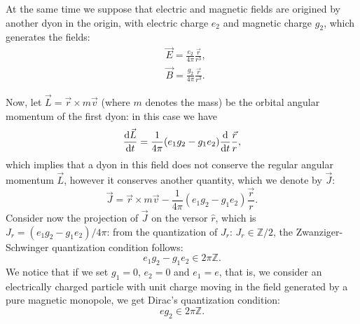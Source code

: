\documentclass[main.tex]{subfiles}
\begin{document}
At the same time we suppose that electric and magnetic fields are origined by another dyon in the origin, with electric charge $e_2$ and magnetic charge $g_2$, which generates the fields:
\begin{align}
&\vec E=\frac{e_2}{4\pi}\frac{\vec r}{r^3},\nonumber\\
&\vec B=\frac{g_2}{4\pi}\frac{\vec r}{r^3}.
\end{align}

Now, let $\vec L=\vec r\times m\vec v$ (where $m$ denotes the mass) be the orbital angular momentum of the first dyon: in this case we have
\begin{equation}
\dv{\vec{L}}{t}
=\frac{1}{4\pi}(e_1g_2-g_1e_2)
\dv{}{t}
\frac{\vec r}{r},
\end{equation}
which implies that a dyon in this field does not conserve the regular angular momentum $\vec L$, however it conserves another quantity, which we denote by $\vec{J}$:
\begin{equation}
\vec J=\vec r\times m\vec v-\frac{1}{4\pi}(e_1g_2-g_1e_2)\frac{\vec r}{r}.
\end{equation}
Consider now the projection of $\vec J$ on the versor $\hat r$, which is $J_r=(e_1g_2-g_1e_2)/4 \pi$: from the quantization of $J_r$: $J_r \in \mathbb Z /2 $, the Zwanziger-Schwinger quantization condition follows:
\begin{equation}
e_1g_2-g_1e_2\in 2 \pi \mathbb{Z}.
\end{equation}
We notice that if we set $g_1=0$, $e_2=0$ and $e_1 = e$, that is, we consider an electrically charged particle with unit charge moving in the field generated by a pure magnetic monopole, we get Dirac's quantization condition:
\begin{equation}
e g_2\in 2 \pi \mathbb{Z}.
\end{equation}

\end{document}
